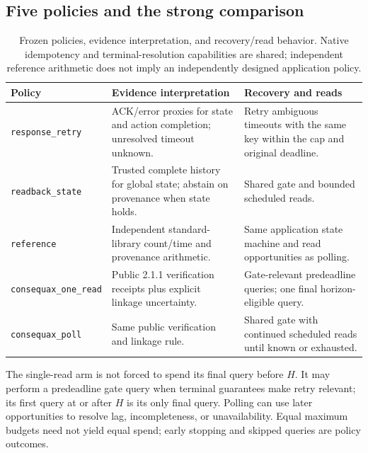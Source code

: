 \documentclass[conference]{IEEEtran}
\begin{document}
\subsection{Five policies and the strong comparison}

\begin{table}[t]
\caption{Frozen policies, evidence interpretation, and recovery/read behavior. Native idempotency and terminal-resolution capabilities are shared; independent reference arithmetic does not imply an independently designed application policy.}
\label{tab:policies}
\centering\small
\setlength{\tabcolsep}{5pt}
\renewcommand{\arraystretch}{1.12}
\begin{tabular}{>{\raggedright\arraybackslash}p{}>{\raggedright\arraybackslash}p{}>{\raggedright\arraybackslash}p{}}
\toprule
Policy & Evidence interpretation & Recovery and reads \\
\midrule
\texttt{response\_retry} & ACK/error proxies for state and action completion; unresolved timeout unknown. & Retry ambiguous timeouts with the same key within the cap and original deadline. \\
\texttt{readback\_state} & Trusted complete history for global state; abstain on provenance when state holds. & Shared gate and bounded scheduled reads. \\
\texttt{reference} & Independent standard-library count/time and provenance arithmetic. & Same application state machine and read opportunities as polling. \\
\texttt{consequax\_one\_read} & Public 2.1.1 verification receipts plus explicit linkage uncertainty. & Gate-relevant predeadline queries; one final horizon-eligible query. \\
\texttt{consequax\_poll} & Same public verification and linkage rule. & Shared gate with continued scheduled reads until known or exhausted. \\
\bottomrule
\end{tabular}
\end{table}

The single-read arm is not forced to spend its final query before $H$. It may perform a predeadline gate query when terminal guarantees make retry relevant; its first query at or after $H$ is its only final query. Polling can use later opportunities to resolve lag, incompleteness, or unavailability. Equal maximum budgets need not yield equal spend; early stopping and skipped queries are policy outcomes.
\end{document}
